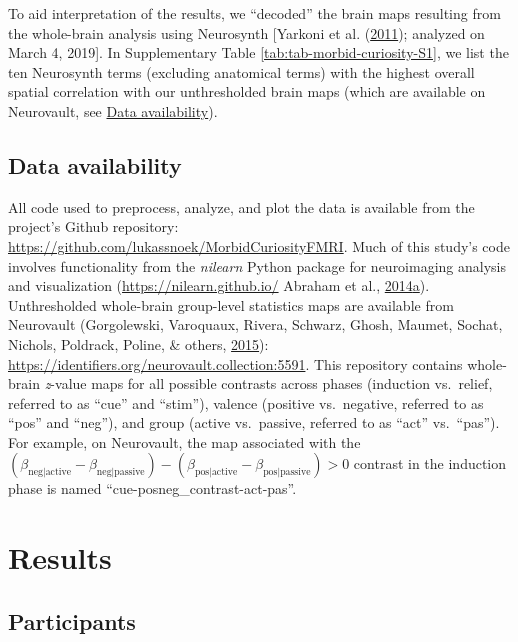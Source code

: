 \documentclass[11pt,american,a4paper,oneside,]{memoir} %
\begin{document}
To aid interpretation of the results, we ``decoded'' the brain maps resulting from the whole-brain analysis using Neurosynth {[}Yarkoni et al. (\protect\hyperlink{ref-yarkoni2011large}{2011}); analyzed on March 4, 2019{]}. In Supplementary Table \ref{tab:tab-morbid-curiosity-S1}, we list the ten Neurosynth terms (excluding anatomical terms) with the highest overall spatial correlation with our unthresholded brain maps (which are available on Neurovault, see \protect\hyperlink{morbid-curiosity-data-availability}{Data availability}).

\hypertarget{morbid-curiosity-data-availability}{%
\subsection{Data availability}\label{morbid-curiosity-data-availability}}

All code used to preprocess, analyze, and plot the data is available from the project's Github repository: \url{https://github.com/lukassnoek/MorbidCuriosityFMRI}. Much of this study's code involves functionality from the \emph{nilearn} Python package for neuroimaging analysis and visualization (\url{https://nilearn.github.io/} Abraham et al., \protect\hyperlink{ref-abraham2014machine}{2014}\protect\hyperlink{ref-abraham2014machine}{a}). Unthresholded whole-brain group-level statistics maps are available from Neurovault (Gorgolewski, Varoquaux, Rivera, Schwarz, Ghosh, Maumet, Sochat, Nichols, Poldrack, Poline, \& others, \protect\hyperlink{ref-gorgolewski2015neurovault}{2015}): \url{https://identifiers.org/neurovault.collection:5591}. This repository contains whole-brain \emph{z}-value maps for all possible contrasts across phases (induction vs.~relief, referred to as ``cue'' and ``stim''), valence (positive vs.~negative, referred to as ``pos'' and ``neg''), and group (active vs.~passive, referred to as ``act'' vs.~``pas''). For example, on Neurovault, the map associated with the \((\beta_{\mathrm{neg | active}} - \beta_{\mathrm{neg | passive}}) - (\beta_{\mathrm{pos | active}} - \beta_{\mathrm{pos | passive}}) > 0\) contrast in the induction phase is named ``cue-posneg\_contrast-act-pas''.

\hypertarget{morbid-curiosity-results}{%
\section{Results}\label{morbid-curiosity-results}}

\hypertarget{morbid-curiosity-results-participants}{%
\subsection{Participants}\label{morbid-curiosity-results-participants}}
\end{document}
